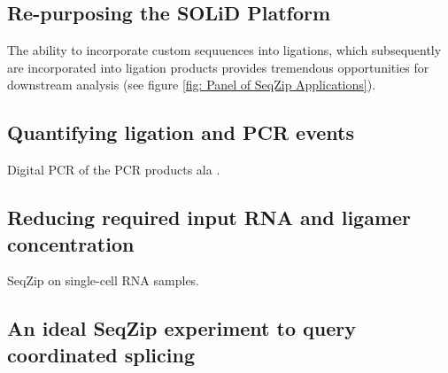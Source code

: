   \subsection{Re-purposing the SOLiD Platform}


    The ability to incorporate custom sequuences into ligations, which subsequently are incorporated into ligation products provides tremendous opportunities for downstream analysis (see figure \ref{fig: Panel of SeqZip Applications}).

  \subsection{Quantifying ligation and PCR events}

    Digital PCR of the PCR products ala \citep{Shiroguchi2012a}. 

  \subsection{Reducing required input RNA and ligamer concentration}

    SeqZip on single-cell RNA samples.

  \subsection{An ideal SeqZip experiment to query coordinated splicing}
    \label{subsec: Ideal multiplex study}


